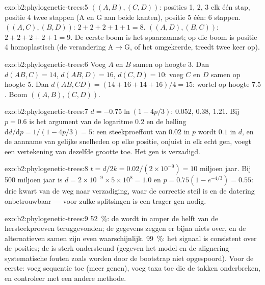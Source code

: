 \begin{solution}{exo:b2:phylogenetic-trees:5}
$((A,B),(C,D))$: posities 1, 2, 3 elk één stap, positie 4 twee stappen
($\mathrm{A}$ en $\mathrm{G}$ aan beide kanten), positie 5 één: 6 stappen.
$((A,C),(B,D))$: $2 + 2 + 2 + 1 + 1 = 8$. $((A,D),(B,C))$: $2 + 2 + 2 +
2 + 1 = 9$. De eerste boom is het spaarzaamst; op die boom is positie 4
homoplastisch (de verandering $\mathrm{A}\to\mathrm{G}$, of het omgekeerde,
treedt twee keer op).
\end{solution}

\begin{solution}{exo:b2:phylogenetic-trees:6}
Voeg $A$ en $B$ samen op hoogte 3. Dan $d(AB,C) = 14$, $d(AB,D) = 16$,
$d(C,D) = 10$: voeg $C$ en $D$ samen op hoogte 5. Dan $d(AB,CD) = (14 + 16
+ 14 + 16)/4 = 15$: wortel op hoogte $7.5$. Boom $((A,B),(C,D))$.
\end{solution}

\begin{solution}{exo:b2:phylogenetic-trees:7}
$d = -0.75\ln(1 - 4p/3)$: $0.052$, $0.38$, $1.21$. Bij $p = 0.6$ is het
argument van de logaritme $0.2$ en de helling $\mathrm{d}d/\mathrm{d}p
= 1/(1 - 4p/3) = 5$: een steekproeffout van $0.02$ in $p$ wordt
$0.1$ in $d$, en de aanname van gelijke snelheden op elke positie,
onjuist in elk echt gen, voegt een vertekening van dezelfde grootte toe. Het
gen is verzadigd.
\end{solution}

\begin{solution}{exo:b2:phylogenetic-trees:8}
$t = d/2k = 0.02/(2\times 10^{-9}) = 10$ miljoen jaar. Bij 500
miljoen jaar is $d = 2\times 10^{-9}\times 5\times 10^{8} = 1.0$ en
$p = 0.75(1 - e^{-4/3}) = 0.55$: drie kwart van de weg naar
verzadiging, waar de correctie steil is en de datering onbetrouwbaar
--- voor zulke splitsingen is een trager gen nodig.
\end{solution}

\begin{solution}{exo:b2:phylogenetic-trees:9}
\qty{52}{\%}: de  wordt in amper de helft van de hersteekproeven
teruggevonden; de gegevens zeggen er bijna niets over, en de alternatieven
samen zijn even waarschijnlijk. \qty{99}{\%}: het signaal is consistent over
de posities; de  is sterk ondersteund (gegeven het model en de
alignering --- systematische fouten zoals  worden
door de bootstrap niet opgespoord). Voor de eerste: voeg sequentie toe (meer
genen), voeg taxa toe die de takken onderbreken, en controleer met een andere
methode.
\end{solution}

